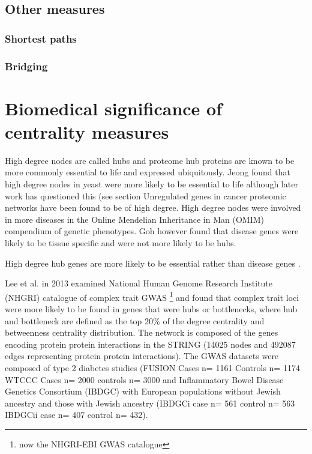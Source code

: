 \subsection{Other measures}
\subsubsection{Shortest paths}


\subsubsection{Bridging}

\cite{valente2010bridging}


\section{Biomedical significance of centrality measures}

 High degree nodes are called hubs and proteome hub proteins are known to be more commonly essential to life \cite{jeong2001lethality} and expressed ubiquitously. \cite{goh2007human}  Jeong found that high degree nodes in yeast were more likely to be essential to life \cite{jeong2001lethality} although later work has questioned this (see section Unregulated genes in cancer proteomic networks have been found to be of high degree. \cite{wachi2005interactome}  High degree nodes were  involved in more diseases in the Online Mendelian Inheritance in Man (OMIM) compendium of genetic phenotypes. \cite{xu2006discovering}  Goh however found that disease genes were likely to be tissue specific and were not more likely to be hubs. \cite{goh2007human}  
 
High degree hub genes are more likely to be essential rather than disease genes \cite{barabasi2011network}. 

Lee et al. \cite{lee2013network} in 2013 examined National Human Genome Research Institute (NHGRI)  catalogue of complex trait GWAS \footnote{now the NHGRI-EBI GWAS catalogue} and found that complex trait loci were more likely to be found in genes that were hubs or bottlenecks, where hub and bottleneck are defined as the top 20\% of the degree centrality and betweenness centrality distribution.  The network is composed of the genes encoding protein protein interactions in the STRING (14025 nodes and 492087 edges representing protein protein interactions). The GWAS datasets were composed of type 2 diabetes studies (FUSION  Cases n=	1161 Controls n=	1174 
WTCCC Cases n=	2000 controls n=	3000  and Inflammatory Bowel Disease Genetics Consortium (IBDGC) with European populations without Jewish ancestry and those with Jewish ancestry (IBDGCi case n=	561 control n=	563 IBDGCii case n= 	407 control n=	432).  


